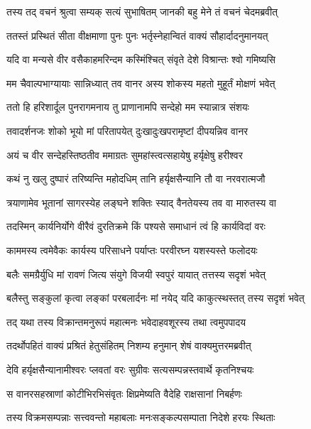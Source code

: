\twolineshloka
{तस्य तद् वचनं श्रुत्वा सम्यक् सत्यं सुभाषितम्}
{जानकी बहु मेने तं वचनं चेदमब्रवीत्} %

\twolineshloka
{ततस्तं प्रस्थितं सीता वीक्षमाणा पुनः पुनः}
{भर्तृस्नेहान्वितं वाक्यं सौहार्दादनुमानयत्} %

\twolineshloka
{यदि वा मन्यसे वीर वसैकाहमरिन्दम}
{कस्मिंश्चित् संवृते देशे विश्रान्तः श्वो गमिष्यसि} %

\twolineshloka
{मम चैवाल्पभाग्यायाः सान्निध्यात् तव वानर}
{अस्य शोकस्य महतो मुहूर्तं मोक्षणं भवेत्} %

\twolineshloka
{ततो हि हरिशार्दूल पुनरागमनाय तु}
{प्राणानामपि सन्देहो मम स्यान्नात्र संशयः} %

\twolineshloka
{तवादर्शनजः शोको भूयो मां परितापयेत्}
{दुःखादुःखपरामृष्टां दीपयन्निव वानर} %

\twolineshloka
{अयं च वीर सन्देहस्तिष्ठतीव ममाग्रतः}
{सुमहांस्त्वत्सहायेषु हर्यृक्षेषु हरीश्वर} %

\twolineshloka
{कथं नु खलु दुष्पारं तरिष्यन्ति महोदधिम्}
{तानि हर्यृक्षसैन्यानि तौ वा नरवरात्मजौ} %

\twolineshloka
{त्रयाणामेव भूतानां सागरस्येह लङ्घने}
{शक्तिः स्याद् वैनतेयस्य तव वा मारुतस्य वा} %

\twolineshloka
{तदस्मिन् कार्यनिर्योगे वीरैवं दुरतिक्रमे}
{किं पश्यसे समाधानं त्वं हि कार्यविदां वरः} %

\twolineshloka
{काममस्य त्वमेवैकः कार्यस्य परिसाधने}
{पर्याप्तः परवीरघ्न यशस्यस्ते फलोदयः} %

\twolineshloka
{बलैः समग्रैर्युधि मां रावणं जित्य संयुगे}
{विजयी स्वपुरं यायात् तत्तस्य सदृशं भवेत्} %

\twolineshloka
{बलैस्तु सङ्कुलां कृत्वा लङ्कां परबलार्दनः}
{मां नयेद् यदि काकुत्स्थस्तत् तस्य सदृशं भवेत्} %

\twolineshloka
{तद् यथा तस्य विक्रान्तमनुरूपं महात्मनः}
{भवेदाहवशूरस्य तथा त्वमुपपादय} %

\twolineshloka
{तदर्थोपहितं वाक्यं प्रश्रितं हेतुसंहितम्}
{निशम्य हनुमान् शेषं वाक्यमुत्तरमब्रवीत्} %

\twolineshloka
{देवि हर्यृक्षसैन्यानामीश्वरः प्लवतां वरः}
{सुग्रीवः सत्यसम्पन्नस्तवार्थे कृतनिश्चयः} %

\twolineshloka
{स वानरसहस्राणां कोटीभिरभिसंवृतः}
{क्षिप्रमेष्यति वैदेहि राक्षसानां निबर्हणः} %

\twolineshloka
{तस्य विक्रमसम्पन्नाः सत्त्ववन्तो महाबलाः}
{मनःसङ्कल्पसम्पाता निदेशे हरयः स्थिताः} %

